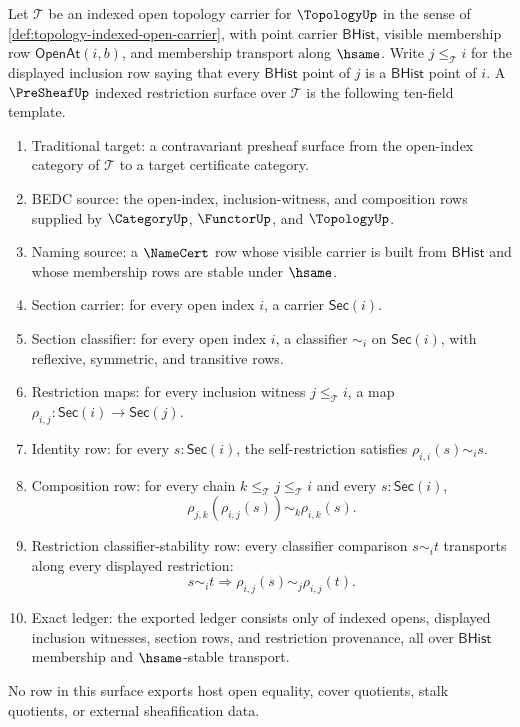 \begin{definition}\label{def:presheaf-indexed-restriction-surface}
Let $\mathcal{T}$ be an indexed open topology carrier for $\TopologyUp$ in the sense of \autoref{def:topology-indexed-open-carrier}, with point carrier $\mathsf{BHist}$, visible membership row $\mathsf{OpenAt}(i,b)$, and membership transport along $\hsame$. Write $j\le_{\mathcal{T}} i$ for the displayed inclusion row saying that every $\mathsf{BHist}$ point of $j$ is a $\mathsf{BHist}$ point of $i$. A $\PreSheafUp$ indexed restriction surface over $\mathcal{T}$ is the following ten-field template.
\begin{enumerate}
\item Traditional target: a contravariant presheaf surface from the open-index category of $\mathcal{T}$ to a target certificate category.
\item BEDC source: the open-index, inclusion-witness, and composition rows supplied by $\CategoryUp$, $\FunctorUp$, and $\TopologyUp$.
\item Naming source: a $\NameCert$ row whose visible carrier is built from $\mathsf{BHist}$ and whose membership rows are stable under $\hsame$.
\item Section carrier: for every open index $i$, a carrier $\mathsf{Sec}(i)$.
\item Section classifier: for every open index $i$, a classifier $\sim_i$ on $\mathsf{Sec}(i)$, with reflexive, symmetric, and transitive rows.
\item Restriction maps: for every inclusion witness $j\le_{\mathcal{T}} i$, a map $\rho_{i,j}:\mathsf{Sec}(i)\to\mathsf{Sec}(j)$.
\item Identity row: for every $s:\mathsf{Sec}(i)$, the self-restriction satisfies $\rho_{i,i}(s)\sim_i s$.
\item Composition row: for every chain $k\le_{\mathcal{T}}j\le_{\mathcal{T}}i$ and every $s:\mathsf{Sec}(i)$,
$$
\rho_{j,k}(\rho_{i,j}(s))\sim_k\rho_{i,k}(s).
$$
\item Restriction classifier-stability row: every classifier comparison $s\sim_i t$ transports along every displayed restriction:
$$
s\sim_i t
\Longrightarrow
\rho_{i,j}(s)\sim_j\rho_{i,j}(t).
$$
\item Exact ledger: the exported ledger consists only of indexed opens, displayed inclusion witnesses, section rows, and restriction provenance, all over $\mathsf{BHist}$ membership and $\hsame$-stable transport.
\end{enumerate}
No row in this surface exports host open equality, cover quotients, stalk quotients, or external sheafification data.
\end{definition}

